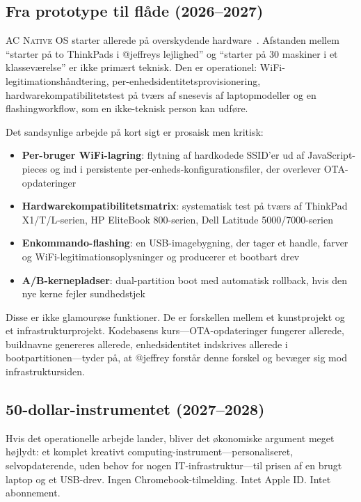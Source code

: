 \documentclass[10pt,letterpaper,twocolumn]{article}
\newcommand{\acos}{\textsc{AC Native OS}}
\begin{document}
\subsection{Fra prototype til flåde (2026--2027)}

\acos{} starter allerede på overskydende hardware~\citep{scudder2026os}. Afstanden mellem ``starter på to ThinkPads i @jeffreys lejlighed'' og ``starter på 30 maskiner i et klasseværelse'' er ikke primært teknisk. Den er operationel: WiFi-legitimationshåndtering, per-enhedsidentitetsprovisionering, hardwarekompatibilitetstest på tværs af snesevis af laptopmodeller og en flashingworkflow, som en ikke-teknisk person kan udføre.

Det sandsynlige arbejde på kort sigt er prosaisk men kritisk:

\begin{itemize}
  \item \textbf{Per-bruger WiFi-lagring}: flytning af hardkodede SSID'er ud af JavaScript-pieces og ind i persistente per-enheds-konfigurationsfiler, der overlever OTA-opdateringer
  \item \textbf{Hardwarekompatibilitetsmatrix}: systematisk test på tværs af ThinkPad X1/T/L-serien, HP EliteBook 800-serien, Dell Latitude 5000/7000-serien
  \item \textbf{Enkommando-flashing}: en USB-imagebygning, der tager et handle, farver og WiFi-legitimationsoplysninger og producerer et bootbart drev
  \item \textbf{A/B-kernepladser}: dual-partition boot med automatisk rollback, hvis den nye kerne fejler sundhedstjek
\end{itemize}

Disse er ikke glamourøse funktioner. De er forskellen mellem et kunstprojekt og et infrastrukturprojekt. Kodebasens kurs---OTA-opdateringer fungerer allerede, buildnavne genereres allerede, enhedsidentitet indskrives allerede i bootpartitionen---tyder på, at @jeffrey forstår denne forskel og bevæger sig mod infrastruktursiden.

\subsection{50-dollar-instrumentet (2027--2028)}

Hvis det operationelle arbejde lander, bliver det økonomiske argument meget højlydt: et komplet kreativt computing-instrument---personaliseret, selvopda\-terende, uden behov for nogen IT-infrastruktur---til prisen af en brugt laptop og et USB-drev. Ingen Chromebook-tilmelding. Intet Apple ID. Intet abonnement.
\end{document}
